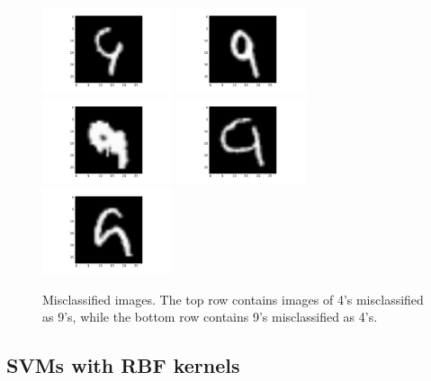 \documentclass{article}
\begin{document}
\begin{multicols}{2}
\begin{figure}[t]
   \includegraphics[width=1.5in]{img/4-1-wrong/4-1-wrong-158.pdf} \hspace{-.25in}
   \includegraphics[width=1.5in]{img/4-1-wrong/4-1-wrong-224.pdf} \hspace{-.25in}
   \includegraphics[width=1.5in]{img/4-1-wrong/4-1-wrong-247.pdf} \hspace{-.25in}
   \includegraphics[width=1.5in]{img/4-1-wrong/4-1-wrong-259.pdf} \hspace{-.25in}
   \includegraphics[width=1.5in]{img/4-1-wrong/4-1-wrong-281.pdf} \hspace{-.25in}
   \caption{Misclassified images.
       The top row contains images of 4's misclassified as 9's,
       while the bottom row contains 9's misclassified as 4's.}
   \label{fig:4-1-wrong}
\end{figure}

\subsection{SVMs with RBF kernels}


\end{multicols}
\end{document}
